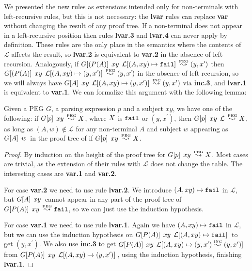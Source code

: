 We presented the new rules as extensions intended only for non-terminals
with left-recursive rules, but this is not necessary: the {\bf lvar}
rules can replace {\bf var} without changing the result of any proof
tree. If a non-terminal does not appear in a left-recursive position
then rules {\bf lvar.3} and {\bf lvar.4} can never apply by
definition. These rules are the only place in the semantics where the
contents of $\mathcal{L}$ affects the result, so {\bf lvar.2} is
equivalent to {\bf var.2} in the absence of left
recursion. Analogously, if $\Matgm{(P(A)}{xy}{\mathcal{L}[(A,xy) \mapsto
  \Nothing]} \Lp (y, x^\prime)$ then $\Matgm{(P(A)}{xy}{\mathcal{L}[(A,xy) \mapsto
  (y, x^\prime)]} \Lp (y, x^\prime)$ in the absence of left recursion,
so we will always have $\Matgm{A}{xy}{\mathcal{L}[(A,xy) \mapsto
  (y, x^\prime)]} \Li (y, x^\prime)$ via {\bf inc.3}, and {\bf lvar.1}
is equivalent to {\bf var.1}. We can formalize this argument with the
following lemma:
\begin{lemma}[Conservativeness]
Given a PEG $G$, a parsing expression $p$ and a subject $xy$, we have
one of the following: if $\Matg{p}{xy} \Lp \Anyx$, where $\Anyx$ is
$\Nothing$ or $(y, x^\prime)$, then $\Matgm{p}{xy}{\mathcal{L}} \Lp
\Anyx$, as long as $(A,w) \not\in \mathcal{L}$ for any non-terminal
$A$ and subject $w$ appearing as $\Matg{A}{w}$ 
in the proof tree of if $\Matg{p}{xy} \Lp \Anyx$.
\end{lemma}
\begin{proof}
By induction on the height of the proof tree for $\Matg{p}{xy} \Lp
\Anyx$. Most cases are trivial, as the extension of their rules with
$\mathcal{L}$ does not change the table. The interesting cases are
{\bf var.1} and {\bf var.2}.

For case {\bf var.2} we need to use rule {\bf lvar.2}. We introduce
$(A, xy) \mapsto \Nothing$ in $\mathcal{L}$, but $\Matg{A}{xy}$ cannot
appear in any part of the proof tree of $\Matg{P(A)}{xy} \Lp
\Nothing$, so we can just use the induction hypothesis.

For case {\bf var.1} we need to use rule {\bf lvar.1}. Again we have $(A,
xy) \mapsto \Nothing$ in $\mathcal{L}$, but we can use the induction
hypothesis on $\Matgm{P(A)}{xy}{\mathcal{L}[(A,xy) \mapsto \Nothing]}$
to get $(y, x^\prime)$. We also use {\bf inc.3} to get $\Matgm{P(A)}{xy}{\mathcal{L}[(A,xy) \mapsto (y,
  x^\prime) \Li (y, x^\prime)]}$ from $\Matgm{P(A)}{xy}{\mathcal{L}[(A,xy) \mapsto (y,
  x^\prime)]}$, using the induction hypothesis, finishing {\bf lvar.1}.
\end{proof}

